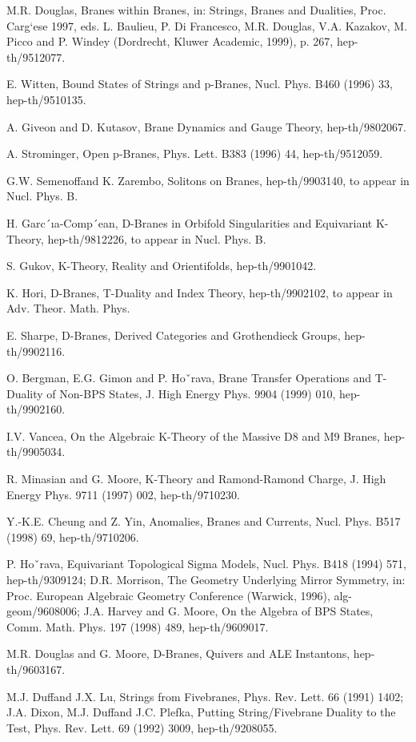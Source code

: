 \documentclass[11pt,a4paper]{ctexart}
\begin{document}
\begin{enumerate}[label={[\arabic*]},leftmargin=*,itemsep=2pt]
\item M.R. Douglas, Branes within Branes, in: Strings, Branes and Dualities, Proc. Carg`ese 1997, eds. L. Baulieu, P. Di Francesco, M.R. Douglas, V.A. Kazakov, M. Picco and P. Windey (Dordrecht, Kluwer Academic, 1999), p. 267, hep-th/9512077.
\item E. Witten, Bound States of Strings and p-Branes, Nucl. Phys. B460 (1996) 33, hep-th/9510135.
\item A. Giveon and D. Kutasov, Brane Dynamics and Gauge Theory, hep-th/9802067.
\item A. Strominger, Open p-Branes, Phys. Lett. B383 (1996) 44, hep-th/9512059.
\item G.W. Semenoffand K. Zarembo, Solitons on Branes, hep-th/9903140, to appear in Nucl. Phys. B.
\item H. Garc´ıa-Comp´ean, D-Branes in Orbifold Singularities and Equivariant K-Theory, hep-th/9812226, to appear in Nucl. Phys. B.
\item S. Gukov, K-Theory, Reality and Orientifolds, hep-th/9901042.
\item K. Hori, D-Branes, T-Duality and Index Theory, hep-th/9902102, to appear in Adv. Theor. Math. Phys.
\item E. Sharpe, D-Branes, Derived Categories and Grothendieck Groups, hep-th/9902116.
\item O. Bergman, E.G. Gimon and P. Hoˇrava, Brane Transfer Operations and T-Duality of Non-BPS States, J. High Energy Phys. 9904 (1999) 010, hep-th/9902160.
\item I.V. Vancea, On the Algebraic K-Theory of the Massive D8 and M9 Branes, hep-th/9905034.
\item R. Minasian and G. Moore, K-Theory and Ramond-Ramond Charge, J. High Energy Phys. 9711 (1997) 002, hep-th/9710230.
\item Y.-K.E. Cheung and Z. Yin, Anomalies, Branes and Currents, Nucl. Phys. B517 (1998) 69, hep-th/9710206.
\item P. Hoˇrava, Equivariant Topological Sigma Models, Nucl. Phys. B418 (1994) 571, hep-th/9309124; D.R. Morrison, The Geometry Underlying Mirror Symmetry, in: Proc. European Algebraic Geometry Conference (Warwick, 1996), alg-geom/9608006; J.A. Harvey and G. Moore, On the Algebra of BPS States, Comm. Math. Phys. 197 (1998) 489, hep-th/9609017.
\item M.R. Douglas and G. Moore, D-Branes, Quivers and ALE Instantons, hep-th/9603167.
\item M.J. Duffand J.X. Lu, Strings from Fivebranes, Phys. Rev. Lett. 66 (1991) 1402; J.A. Dixon, M.J. Duffand J.C. Plefka, Putting String/Fivebrane Duality to the Test, Phys. Rev. Lett. 69 (1992) 3009, hep-th/9208055.

\end{enumerate}
\end{document}
